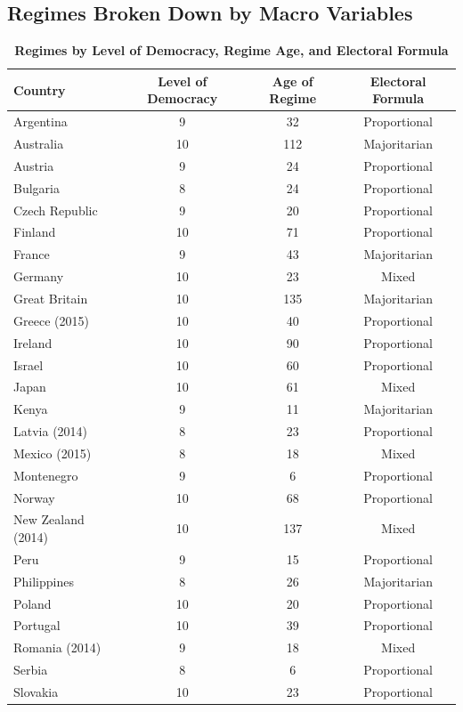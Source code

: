\documentclass[12pt, titlepage]{article}
\newcommand\tb{\textbf}
\begin{document}
\begin{appendices}
	
\section{Regimes Broken Down by Macro Variables}
\label{AppendixC}

\begin{table} [h!]
	\centering
	\caption{\tb{Regimes by Level of Democracy, Regime Age, and Electoral Formula}}
	\begin{tabulary}{\linewidth}{l c c c}
		\hline
		\tb{Country} & \tb{Level of Democracy} & \tb{Age of Regime} & \tb{Electoral Formula} \\
		\hline
		Argentina&9&32&Proportional \\
		Australia& 10&112&Majoritarian \\
		Austria&9&24&Proportional\\
		Bulgaria&8&24&Proportional\\
		Czech Republic&9&20&Proportional \\
		Finland&10&71& Proportional \\
		France&9&43&Majoritarian \\
		Germany&10&23&Mixed \\
		Great Britain&10&135&Majoritarian \\
		Greece (2015)&10&40&Proportional \\
		Ireland&10&90&Proportional \\
		Israel&10&60&Proportional \\
		Japan&10&61&Mixed\\
		Kenya&9&11&Majoritarian \\
		Latvia (2014)&8&23&Proportional\\
		Mexico (2015)& 8&18&Mixed\\
		Montenegro&9&6&Proportional\\
		Norway&10&68&Proportional\\
		New Zealand (2014)& 10& 137& Mixed\\
		Peru&9&15&Proportional\\
		Philippines&8&26&Majoritarian\\
		Poland&10&20&Proportional\\
		Portugal&10&39&Proportional\\
		Romania (2014) &9&18& Mixed \\
		Serbia& 8&6&Proportional\\
		Slovakia&10&23&Proportional\\

\end{tabulary}
\end{table}
\end{appendices}
\end{document}
